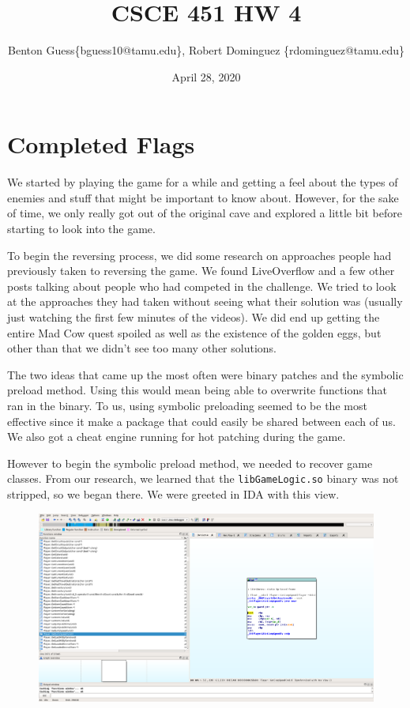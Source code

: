 \documentclass[11pt]{article}
\title{CSCE 451 HW 4}
\author{Benton Guess\{bguess10@tamu.edu\}, Robert Dominguez \{rdominguez@tamu.edu\}}
\date{April 28, 2020}
\begin{document}
\maketitle

\section*{Completed Flags}
We started by playing the game for a while and getting a feel about the types of enemies and stuff that might be important to know about. However, for the sake of time, we only really got out of the original cave and explored a little bit before starting to look into the game.

To begin the reversing process, we did some research on approaches people had previously taken to reversing the game. We found LiveOverflow and a few other posts talking about people who had competed in the challenge. We tried to look at the approaches they had taken without seeing what their solution was (usually just watching the first few minutes of the videos). We did end up getting the entire Mad Cow quest spoiled as well as the existence of the golden eggs, but other than that we didn't see too many other solutions.

The two ideas that came up the most often were binary patches and the symbolic preload method. Using this would mean being able to overwrite functions that ran in the binary. To us, using symbolic preloading seemed to be the most effective since it make a package that could easily be shared between each of us. We also got a cheat engine running for hot patching during the game.

However to begin the symbolic preload method, we needed to recover game classes. From our research, we learned that the \texttt{libGameLogic.so} binary was not stripped, so we began there. We were greeted in IDA with this view.
\begin{figure}[H]
    \centering
    \includegraphics[width=1.00\linewidth]{ida_view.png}
\end{figure}
\end{document}
